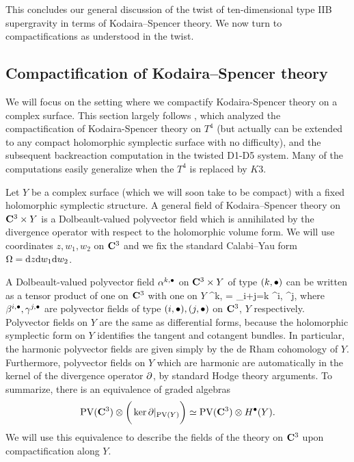 \documentclass[../main.tex]{subfiles}
\begin{document}
This concludes our general discussion of the twist of ten-dimensional type IIB supergravity in terms of Kodaira--Spencer theory. 
We now turn to compactifications as understood in the twist. 

\subsection{Compactification of Kodaira--Spencer theory}

We will focus on the setting where we compactify Kodaira-Spencer theory on a complex surface. This section largely  follows \cite{CP}, which analyzed the compactification of Kodaira-Spencer theory on $T^4$ (but actually can be extended to any compact holomorphic symplectic surface with no difficulty), and the subsequent backreaction computation in the twisted D1-D5 system. Many of the computations easily generalize when the $T^4$ is replaced by $K3$. 

Let $Y$ be a complex surface (which we will soon take to be compact) with a fixed holomorphic symplectic structure.
A general field of Kodaira--Spencer theory on $\mathbf{C}^3 \times Y$ is a Dolbeault-valued polyvector field which is annihilated by the divergence operator with respect to the holomorphic volume form.
We will use coordinates $z,w_1,w_2$ on $\mathbf{C}^3$ and we fix the standard Calabi--Yau form $\Omega = \mathrm{d} z \mathrm{d} w_1 \mathrm{d} w_2$.

A Dolbeault-valued polyvector field $\alpha^{k,{\bullet}}$ on $\mathbf{C}^3 \times Y$ of type $(k,{\bullet})$ can be written as a tensor product of one on $\mathbf{C}^3$ with one on $Y$
\beqn
\alpha^{k,\bu} = \sum_{i+j=k} \beta^{i,\bu} \otimes \gamma^{j,\bu} 
\eeqn
where $\beta^{i,{\bullet}},\gamma^{j,{\bullet}}$ are polyvector fields of type $(i,{\bullet}),(j,{\bullet})$ on $\mathbf{C}^3$, $Y$ respectively.
Polyvector fields on $Y$ are the same as differential forms, because the holomorphic symplectic form on $Y$ identifies the tangent and cotangent bundles. 
In particular, the harmonic polyvector fields are given simply by the de Rham cohomology of $Y$.  
Furthermore, polyvector fields on $Y$ which are harmonic are automatically in the kernel of the divergence operator $\partial$, by standard Hodge theory arguments.   
To summarize, there is an equivalence of graded algebras
\[
{\rm PV} (\mathbf{C}^3) \otimes \bigg(\ker \partial |_{{\rm PV}(Y)} \bigg) \simeq {\rm PV}(\mathbf{C}^3) \otimes H^{\bullet}(Y) .
\]
We will use this equivalence to describe the fields of the theory on $\mathbf{C}^3$ upon compactification along $Y$.
\end{document}
